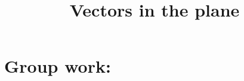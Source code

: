 \documentclass[]{ximera}
\title{Vectors in the plane}
\begin{document}
\begin{abstract}		\end{abstract}
\maketitle



\begin{comment}
\section{Warm up:}

	\begin{freeResponse}
	
	\end{freeResponse}
	
\begin{instructorNotes}

\end{instructorNotes}
\end{comment}







\section{Group work:}
\end{document}
